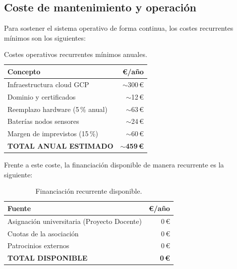 \subsection{Coste de mantenimiento y operaci\'on}

Para sostener el sistema operativo de forma continua, los costes
recurrentes m\'inimos son los siguientes:

\begin{table}[H]
    \centering
    \caption{Costes operativos recurrentes m\'inimos anuales.}
    \label{tab:operativo}
    \begin{tabular}{lr}
        \toprule
        \textbf{Concepto} & \textbf{\textbf{\euro}/a\~no} \\
        \midrule
        Infraestructura cloud GCP             & $\sim$300\,\euro \\
        Dominio y certificados                & $\sim$12\,\euro \\
        Reemplazo hardware (5\,\% anual)      & $\sim$63\,\euro \\
        Bater\'ias nodos sensores             & $\sim$24\,\euro \\
        Margen de imprevistos (15\,\%)        & $\sim$60\,\euro \\
        \midrule
        \textbf{TOTAL ANUAL ESTIMADO}         & \textbf{$\sim$459\,\euro} \\
        \bottomrule
    \end{tabular}
\end{table}

Frente a este coste, la financiaci\'on disponible de manera recurrente
es la siguiente:

\begin{table}[H]
    \centering
    \caption{Financiaci\'on recurrente disponible.}
    \label{tab:financiacion}
    \begin{tabular}{lr}
        \toprule
        \textbf{Fuente} & \textbf{\textbf{\euro}/a\~no} \\
        \midrule
        Asignaci\'on universitaria (Proyecto Docente) & 0\,\euro \\
        Cuotas de la asociaci\'on                     & 0\,\euro \\
        Patrocinios externos                          & 0\,\euro \\
        \midrule
        \textbf{TOTAL DISPONIBLE}                     & \textbf{0\,\euro} \\
        \bottomrule
    \end{tabular}
\end{table}


